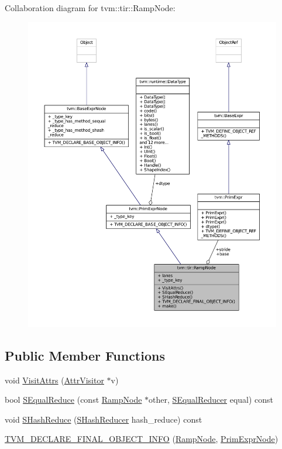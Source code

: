 Collaboration diagram for tvm\+:\+:tir\+:\+:Ramp\+Node\+:
\nopagebreak
\begin{figure}[H]
\begin{center}
\leavevmode
\includegraphics[width=350pt]{classtvm_1_1tir_1_1RampNode__coll__graph}
\end{center}
\end{figure}
\subsection*{Public Member Functions}
\begin{DoxyCompactItemize}
\item 
void \hyperlink{classtvm_1_1tir_1_1RampNode_a57d0d4129dc260fc2a79e50ad2dc3e68}{Visit\+Attrs} (\hyperlink{classtvm_1_1AttrVisitor}{Attr\+Visitor} $\ast$v)
\item 
bool \hyperlink{classtvm_1_1tir_1_1RampNode_aed36222cfc75644cdb8b7619cc9b69eb}{S\+Equal\+Reduce} (const \hyperlink{classtvm_1_1tir_1_1RampNode}{Ramp\+Node} $\ast$other, \hyperlink{classtvm_1_1SEqualReducer}{S\+Equal\+Reducer} equal) const 
\item 
void \hyperlink{classtvm_1_1tir_1_1RampNode_a0e2cf22aeaf189ee98c531b7690a36bc}{S\+Hash\+Reduce} (\hyperlink{classtvm_1_1SHashReducer}{S\+Hash\+Reducer} hash\+\_\+reduce) const 
\item 
\hyperlink{classtvm_1_1tir_1_1RampNode_a629cd866fede17452cad91e49ce2b7ba}{T\+V\+M\+\_\+\+D\+E\+C\+L\+A\+R\+E\+\_\+\+F\+I\+N\+A\+L\+\_\+\+O\+B\+J\+E\+C\+T\+\_\+\+I\+N\+FO} (\hyperlink{classtvm_1_1tir_1_1RampNode}{Ramp\+Node}, \hyperlink{classtvm_1_1PrimExprNode}{Prim\+Expr\+Node})
\end{DoxyCompactItemize}
